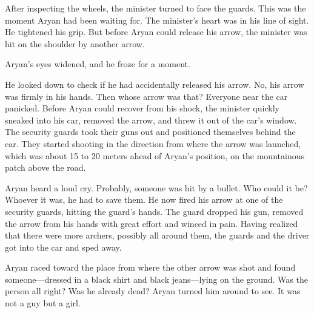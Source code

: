 After inspecting the wheels, the minister turned to face the guards. This was
the moment Aryan had been waiting for. The minister's heart was in his line of
sight.  He tightened his grip. But before Aryan could release his arrow, the
minister was hit on the shoulder by another arrow.

Aryan's eyes widened, and he froze for a moment.

He looked down to check if he had accidentally released his arrow. No, his arrow
was firmly in his hands. Then whose arrow was that? Everyone near the car
panicked. Before Aryan could recover from his shock, the minister quickly
sneaked into his car, removed the arrow, and threw it out of the car's window.
The security guards took their guns out and positioned themselves behind the
car. They started shooting in the direction from where the arrow was launched,
which was about 15 to 20 meters ahead of Aryan's position, on the mountainous
patch above the road.

Aryan heard a loud cry. Probably, someone was hit by a bullet. Who could it be?
Whoever it was, he had to save them. He now fired his arrow at one of the
security guards, hitting the guard's hands. The guard dropped his gun, removed
the arrow from his hands with great effort and winced in pain. Having realized
that there were more archers, possibly all around them, the guards and the
driver got into the car and sped away.

Aryan raced toward the place from where the other arrow was shot and found
someone—dressed in a black shirt and black jeans—lying on the ground. Was
the person all right? Was he already dead? Aryan turned him around to see. It
was not a guy but a girl.
